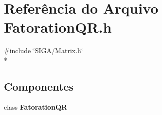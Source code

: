 \section{Referência do Arquivo Fatoration\+Q\+R.\+h}
\label{_fatoration_q_r_8h}
{\ttfamily \#include \char`\"{}S\+I\+G\+A/\+Matrix.\+h\char`\"{}}\\*
\subsection*{Componentes}
\begin{DoxyCompactItemize}
\item 
class {\bf Fatoration\+QR}
\end{DoxyCompactItemize}
